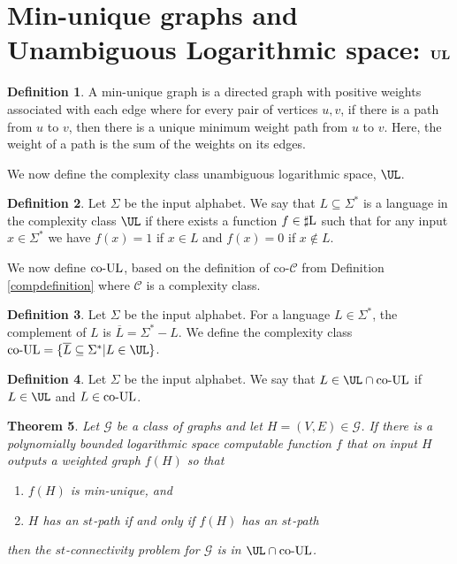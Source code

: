 \documentclass{amsbook}
\newtheorem{theorem}{Theorem}[chapter]
\theoremstyle{definition}
\newtheorem{definition}[theorem]{Definition}
\theoremstyle{remark}
\numberwithin{section}{chapter}
\numberwithin{equation}{chapter}
\newcommand{\boldUL}{\mbox{\rm \bf UL}}
\newcommand{\coUL}{\mbox{\rm co-UL}}
\newcommand{\sharpL}{\mbox{$\sharp$\rm L}}
\begin{document}
\section{Min-unique graphs and Unambiguous Logarithmic space: $\boldUL$}
\begin{definition}\label{minunique}
A min-unique graph is a directed graph with positive weights associated with each edge where for every pair of vertices $u,v$, if there is a path from $u$ to $v$, then there is a unique minimum weight path from $u$ to $v$. Here, the weight of a path is the sum of the weights on its edges.
\end{definition}
We now define the complexity class unambiguous logarithmic space, $\UL$.
\begin{definition}\label{UL}
Let $\Sigma$ be the input alphabet. We say that $L\subseteq\Sigma ^{*}$ is a language in the complexity class $\UL$ if there exists a function $f\in \sharpL$ such that for any input $x\in\Sigma ^{*}$ we have $f(x)=1$ if $x\in L$ and $f(x)=0$ if $x\not\in L$.
\end{definition}
We now define $\coUL$, based on the definition of $\mbox{co-}\mathcal{C}$ from Definition \ref{compdefinition} where $\mathcal{C}$ is a complexity class.
\begin{definition}\label{coUL}
Let $\Sigma$ be the input alphabet. For a language $L\in\Sigma^*$, the complement of $L$ is $\overline{L}=\Sigma^*-L$. We define the complexity class $\coUL=\{ \overline{L}\subseteq \Sigma ^*|L\in\UL\}$.
\end{definition}
\begin{definition}
Let $\Sigma$ be the input alphabet. We say that $L\in\UL\cap\coUL$ if $L\in\UL$ and $L\in\coUL$.
\end{definition}
\begin{theorem}\label{min-unique-st-connectivity-UL}
Let $\mathcal{G}$ be a class of graphs and let $H=(V,E)\in\mathcal{G}$. If there is a polynomially bounded logarithmic space computable function $f$ that on input $H$ outputs a weighted graph $f(H)$ so that
\begin{enumerate}
\item $f(H)$ is min-unique, and
\item $H$ has an $st$-path if and only if $f(H)$ has an $st$-path
\end{enumerate}
then the $st$-connectivity problem for $\mathcal{G}$ is in $\UL\cap\coUL$.
\end{theorem}
\end{document}
